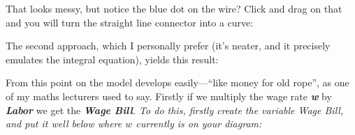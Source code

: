 That looks messy, but notice the blue dot on the wire? Click and drag
on that and you will turn the straight line connector into a curve:
\begin{center}
\par\end{center}

The second approach, which I personally prefer (it's neater, and it
precisely emulates the integral equation), yields this result:
\begin{center}
\par\end{center}

From this point on the model develops easily---``like money for
old rope'', as one of my maths lecturers used to say. Firstly if
we multiply the wage rate \textbf{\em w} by \textbf{\em Labor} we
get the {\em\textbf{Wage Bill}. To do this, firstly create the
variable Wage Bill, and put it well below where $w$ currently is
on your diagram:}
\begin{center}
\par\end{center}

